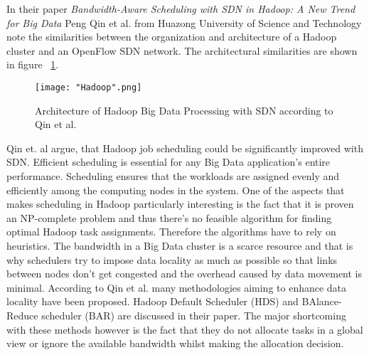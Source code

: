 \documentclass{acm_proc_article-sp}
\begin{document}
In their paper \textit{Bandwidth-Aware Scheduling with SDN in Hadoop: A New Trend for Big Data} \cite{Scheduling} Peng Qin et al. from Huazong University of Science and Technology note the similarities between the organization and architecture of a Hadoop cluster and an OpenFlow SDN network. The architectural similarities are shown in figure ~\ref{fig:hadoop}.

\begin{figure}[ht!]
\centering
{}
\texttt{[image: "Hadoop".png]}
\caption{Architecture of Hadoop Big Data Processing with SDN according to Qin et al. \cite{Scheduling}}
\label{fig:hadoop}
\end{figure} 

Qin et. al argue, that Hadoop job scheduling could be significantly improved with SDN. Efficient scheduling is essential for any Big Data application's entire performance. Scheduling ensures that the workloads are assigned evenly and efficiently among the computing nodes in the system. One of the aspects that makes scheduling in Hadoop particularly interesting is the fact that it is proven an NP-complete problem \cite{Fischer:2010:ATE:1810479.1810484} and thus there's no feasible algorithm for finding optimal Hadoop task assignments. Therefore the algorithms have to rely on heuristics. The bandwidth in a Big Data cluster is a scarce resource and that is why schedulers try to impose data locality as much as possible so that links between nodes don't get congested and the overhead caused by data movement is minimal. According to Qin et al. many methodologies aiming to enhance data locality have been proposed. Hadoop Default Scheduler (HDS) and BAlance-Reduce scheduler (BAR) are discussed in their paper. The major shortcoming with these methods however is the fact that they do not allocate tasks in a global view or ignore the available bandwidth whilst making the allocation decision.
\end{document}
